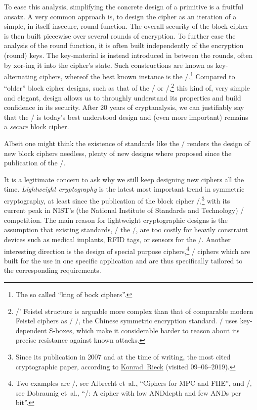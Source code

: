 To ease this analysis, simplifying the concrete design of a primitive is a fruitful ansatz.
A very common approach is, to design the cipher as an iteration of a simple, in itself insecure, round function.
The overall security of the block cipher is then built piecewise over several rounds of encryption.
To further ease the analysis of the round function, it is often built independently of the encryption (round) keys.
The key-material is instead introduced in between the rounds, often by xor-ing it into the cipher's state.
Such constructions are known as key-alternating ciphers, whereof the best known instance is the \AES/.\footnote{%
    The so called \enquote{king of bock ciphers}.
}
Compared to \enquote{older} block cipher designs, such as that of the \DES/ or \blowfish/,\footnote{%
    \DES/' Feistel structure is arguable more complex than that of comparable modern Feistel ciphers as \eg/ /, the Chinese symmetric encryption standard.
    \blowfish/ uses key-dependent S-boxes, which make it considerable harder to reason about its precise resistance against known attacks.
} this kind of, very simple and elegant, design allows us to throughly understand its properties and build confidence in its security.
After 20 years of cryptanalysis, we can justifiably say that the \AES/ is today's best understood design and (even more important) remains a \emph{secure} block cipher.

Albeit one might think the existence of standards like the \AES/ renders the design of new block ciphers needless, plenty of new designs where proposed since the publication of the \AES/.

It is a legitimate concern to ask why we still keep designing new ciphers all the time.
\emph{Lightweight cryptography} is the latest most important trend in symmetric cryptography, at least since the publication of the block cipher \present/,\footnote{%
    Since its publication in 2007 and at the time of writing, the most cited cryptographic paper, according to \href{https://www.sec.cs.tu-bs.de/~konrieck/topnotch/crypto_top100.html}{Konrad~Rieck} (visited 09--06--2019).
} with its current peak in NIST's (the National Institute of Standards and Technology) \LWC/ competition.
The main reason for lightweight cryptographic designs is the assumption that existing standards, \eg/ the \AES/, are too costly for heavily constraint devices such as medical implants, RFID tags, or sensors for the \iot/.
Another interesting direction is the design of special purpose ciphers,\footnote{%
    Two examples are \lowmc/, see Albrecht et~al., \enquote{Ciphers for MPC and FHE}, and \rasta/, see Dobraunig et~al., \enquote{\rasta/: A cipher with low ANDdepth and few ANDs per bit}.
} \ie/ ciphers which are built for the use in one specific application and are thus specifically tailored to the corresponding requirements.


